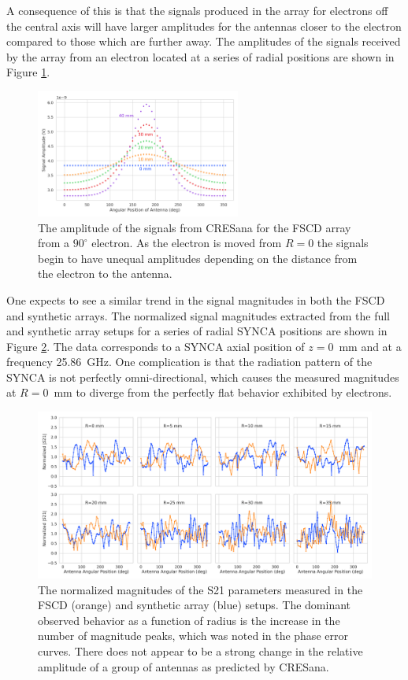 A consequence of this is that the signals produced in the array for electrons off the central axis will have larger amplitudes for the antennas closer to the electron compared to those which are further away. The amplitudes of the signals received by the array from an electron located at a series of radial positions are shown in Figure \ref{fig:cresana_mags}.
\begin{figure}[htbp]
    \centering
    \includegraphics[width=0.6\textwidth]{figs/Chapter-5/230508_cresana_mags.png}
    \caption{The amplitude of the signals from CRESana for the FSCD array from a $90^\circ$ electron. As the electron is moved from $R=0$ the signals begin to have unequal amplitudes depending on the distance from the electron to the antenna.}
    \label{fig:cresana_mags}
\end{figure}

One expects to see a similar trend in the signal magnitudes in both the FSCD and synthetic arrays. The normalized signal magnitudes extracted from the full and synthetic array setups for a series of radial SYNCA positions are shown in Figure \ref{fig:jugaad_synth_mag_curve_comp}. The data corresponds to a SYNCA axial position of $z=0$~mm and at a frequency 25.86~GHz. One complication is that the radiation pattern of the SYNCA is not perfectly omni-directional, which causes the measured magnitudes at $R=0$~mm to diverge from the perfectly flat behavior exhibited by electrons.
\begin{figure}[htbp]
    \centering
    \includegraphics[width=1\textwidth]{figs/Chapter-5/230412_jugaad_mag_curves_z0.png}
    \caption{The normalized magnitudes of the S21 parameters measured in the FSCD (orange) and synthetic array (blue) setups. The dominant observed behavior as a function of radius is the increase in the number of magnitude peaks, which was noted in the phase error curves. There does not appear to be a strong change in the relative amplitude of a group of antennas as predicted by CRESana.}
    \label{fig:jugaad_synth_mag_curve_comp}
\end{figure}

